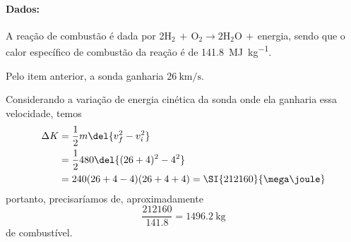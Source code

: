 \documentclass[]{IMTexam}
\begin{document}
\begin{questions}
\begin{parts}
		\paragraph{Dados:} A reação de combustão é dada por 2H$_2\,+\,$O$_2 \to $2H$_2$O$\,+\,$energia, sendo que o calor específico de combustão da reação é de \SI{141,8}{\mega\joule\per\kilogram}.
		
		\begin{solution}
			Pelo item anterior, a sonda ganharia $ \SI{26}{\kilo\meter\per\second} $.
			
			Considerando a variação de energia cinética da sonda onde ela ganharia essa velocidade, temos
			\begin{align*}
				\Delta K&=\dfrac{1}{2}m\del{v_f^{2}-v_i^{2}}\\
				&=\dfrac{1}{2}480\del{(26+4)^{2}-4^{2}}\\
				&=240(26+4-4)(26+4+4)=\SI{212160}{\mega\joule} 
			\end{align*}
			portanto, precisaríamos de, aproximadamente
			\[ \dfrac{\num{212160}}{\num{141.8}}=\SI{1496.2}{\kilogram} \]
			de combustível.
		\end{solution}
	\end{parts}

\end{questions}
\end{document}
